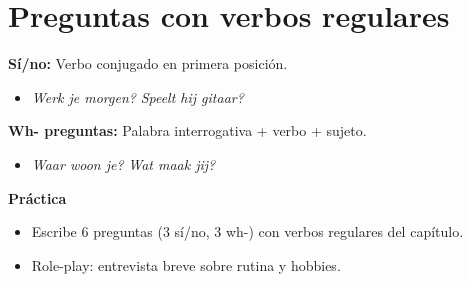 \section{Preguntas con verbos regulares}
\textbf{Sí/no:} Verbo conjugado en primera posición.
\begin{itemize}[leftmargin=*]
  \item \textit{Werk je morgen?} \textit{Speelt hij gitaar?}
\end{itemize}

\textbf{Wh- preguntas:} Palabra interrogativa + verbo + sujeto.
\begin{itemize}[leftmargin=*]
  \item \textit{Waar woon je?} \textit{Wat maak jij?}
\end{itemize}

\textbf{Práctica}
\begin{itemize}[leftmargin=*]
  \item Escribe 6 preguntas (3 sí/no, 3 wh-) con verbos regulares del capítulo.
  \item Role-play: entrevista breve sobre rutina y hobbies.
\end{itemize}
